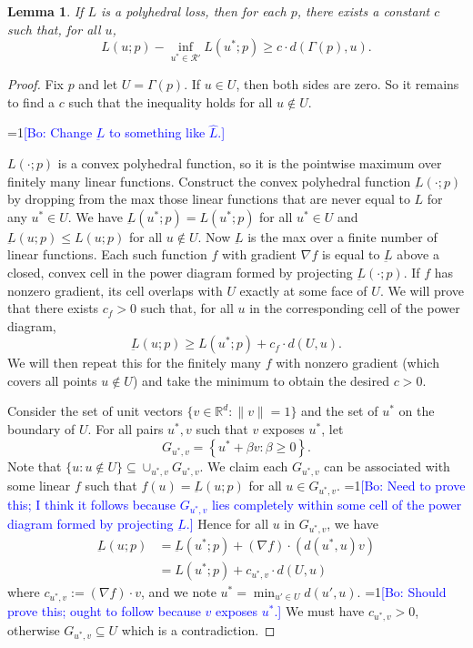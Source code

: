 \documentclass[12pt]{article}
\newcommand{\Comments}{1}
\newcommand{\mynote}[2]{\ifnum\Comments=1\textcolor{#1}{#2}\fi}
\newcommand{\bo}[1]{\mynote{blue}{[Bo: #1]}}
\newcommand{\reals}{\mathbb{R}}
\newcommand{\R}{\mathcal{R}}
\newtheorem{lemma}{Lemma}
\begin{document}
\begin{lemma} \label{lemma:distance-loss}
  If $L$ is a polyhedral loss, then for each $p$, there exists a constant $c$ such that, for all $u$,
    \[ L(u;p) - \inf_{u^* \in \R'} L(u^*;p) \geq c \cdot d(\Gamma(p),u) . \]
\end{lemma}
\begin{proof}
  Fix $p$ and let $U = \Gamma(p)$.
  If $u \in U$, then both sides are zero.
  So it remains to find a $c$ such that the inequality holds for all $u \not\in U$.

  \bo{Change $\underbar{L}$ to something like $\hat{L}$.}
  
  $L(\cdot;p)$ is a convex polyhedral function, so it is the pointwise maximum over finitely many linear functions.
  Construct the convex polyhedral function $\underbar{L}(\cdot;p)$ by dropping from the max those linear functions that are never equal to $L$ for any $u^* \in U$.
  We have $\underbar{L}(u^*;p) = L(u^*;p)$ for all $u^* \in U$ and $\underbar{L}(u;p) \leq L(u;p)$ for all $u \not\in U$.
  Now $\underbar{L}$ is the max over a finite number of linear functions.
  Each such function $f$ with gradient $\nabla f$ is equal to $\underbar{L}$ above a closed, convex cell in the power diagram formed by projecting $\underbar{L}(\cdot;p)$.
  If $f$ has nonzero gradient, its cell overlaps with $U$ exactly at some face of $U$.
  We will prove that there exists $c_f > 0$ such that, for all $u$ in the corresponding cell of the power diagram,
    \[ \underbar{L}(u;p) \geq L(u^*;p) + c_f \cdot d(U,u) . \]
  We will then repeat this for the finitely many $f$ with nonzero gradient (which covers all points $u \not\in U$) and take the minimum to obtain the desired $c > 0$.

  Consider the set of unit vectors $\{v \in \reals^d : \|v\|=1\}$ and the set of $u^*$ on the boundary of $U$.
  For all pairs $u^*,v$ such that $v$ exposes $u^*$, let
    \[ G_{u^*,v} = \left\{ u^* + \beta v : \beta \geq 0 \right\} . \]
  Note that $\{ u : u \not\in U\} \subseteq \cup_{u^*,v} G_{u^*,v}$.
  We claim each $G_{u^*,v}$ can be associated with some linear $f$ such that $f(u) = \underbar{L}(u;p)$ for all $u \in G_{u^*,v}$.
  \bo{Need to prove this; I think it follows because $G_{u^*,v}$ lies completely within some cell of the power diagram formed by projecting $\underbar{L}$.}
  Hence for all $u$ in $G_{u^*,v}$, we have
  \begin{align*}
    \underbar{L}(u;p) &= \underbar{L}(u^*;p) + (\nabla f) \cdot (d(u^*,u) v)  \\
                      &= L(u^*;p) + c_{u^*,v} \cdot d(U,u)
  \end{align*}
  where $c_{u^*,v} := (\nabla f) \cdot v$, and we note $u^* = \min_{u' \in U} d(u',u)$. \bo{Should prove this; ought to follow because $v$ exposes $u^*$.}
  We must have $c_{u^*,v} > 0$, otherwise $G_{u^*,v} \subseteq U$ which is a contradiction.
  

\end{proof}
\end{document}
